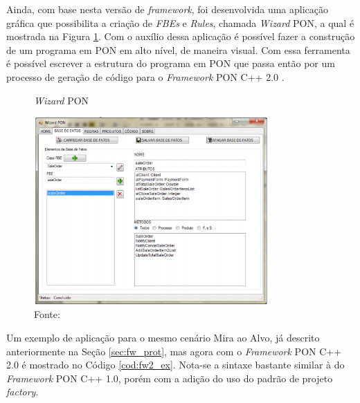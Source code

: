 Ainda, com base nesta versão de \textit{framework}, foi desenvolvida uma aplicação
gráfica que possibilita a criação de \textit{FBEs} e \textit{Rules}, chamada
\textit{Wizard} PON, a qual é mostrada na Figura \ref{fig:wizard}. Com o auxílio
dessa aplicação é possível fazer a construção de um programa em PON em alto
nível, de maneira visual. Com essa ferramenta é possível escrever a estrutura do
programa em PON que passa então por um processo de geração de código para o
\textit{Framework} PON C++ 2.0 \cite{msc_valenca_2012}.

\begin{figure}[!htb]
  \centering
  \caption{\textit{Wizard} PON} \includegraphics[width=0.8\textwidth]{../figures/wizard.png}
  \caption*{Fonte: }
  \label{fig:wizard}
\end{figure}

Um exemplo de aplicação para o mesmo cenário Mira ao Alvo, já descrito
anteriormente na Seção \ref{sec:fw_prot}, mas agora com o \textit{Framework} PON
C++ 2.0 é mostrado no Código \ref{cod:fw2_ex}. Nota-se a sintaxe bastante
similar à do \textit{Framework} PON C++ 1.0, porém com a adição do uso do padrão
de projeto \textit{factory}. 

